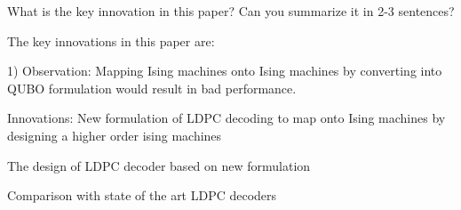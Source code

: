 What is the key innovation in this paper? Can you summarize it in 2-3 sentences?

The key innovations in this paper are:

1) Observation: Mapping Ising machines onto Ising machines by converting into QUBO formulation would result in bad performance.

Innovations:
New formulation of LDPC decoding to map onto Ising machines by designing a higher order ising machines
 
The design of LDPC decoder based on new formulation 

Comparison with state of the art LDPC decoders 

